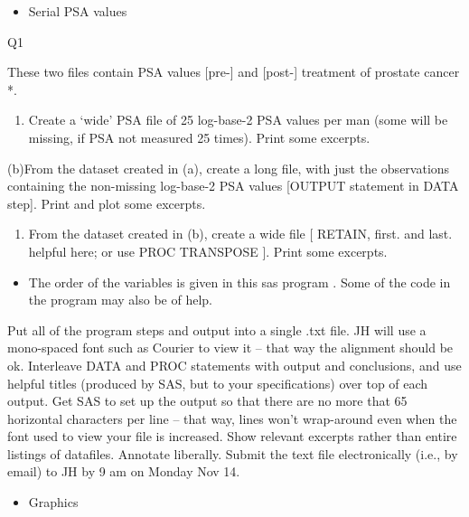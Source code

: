 \documentclass[]{book}
\providecommand{\tightlist}{%
  \setlength{\itemsep}{0pt}\setlength{\parskip}{0pt}}
\begin{document}
\begin{itemize}
\tightlist
\item
  Serial PSA values
\end{itemize}

Q1

These two files contain PSA values {[}pre-{]} and {[}post-{]} treatment of prostate cancer *.

\begin{enumerate}
\def\labelenumi{(\alph{enumi})}
\tightlist
\item
  Create a `wide' PSA file of 25 log-base-2 PSA values per man (some will be missing, if PSA not measured 25 times). Print some excerpts.
\end{enumerate}

(b)From the dataset created in (a), create a long file, with just the observations containing the non-missing log-base-2 PSA values {[}OUTPUT statement in DATA step{]}. Print and plot some excerpts.

\begin{enumerate}
\def\labelenumi{(\alph{enumi})}
\setcounter{enumi}{2}
\tightlist
\item
  From the dataset created in (b), create a wide file {[} RETAIN, first. and last. helpful here; or use PROC TRANSPOSE {]}. Print some excerpts.
\end{enumerate}

\begin{itemize}
\tightlist
\item
  The order of the variables is given in this sas program . Some of the code in the program may also be of help.
\end{itemize}

Put all of the program steps and output into a single .txt file. JH will use a mono-spaced font such as Courier to view it -- that way the alignment should be ok. Interleave DATA and PROC statements with output and conclusions, and use helpful titles (produced by SAS, but to your specifications) over top of each output. Get SAS to set up the output so that there are no more that 65 horizontal characters per line -- that way, lines won't wrap-around even when the font used to view your file is increased. Show relevant excerpts rather than entire listings of datafiles. Annotate liberally. Submit the text file electronically (i.e., by email) to JH by 9 am on Monday Nov 14.

\begin{itemize}
\tightlist
\item
  Graphics
\end{itemize}
\end{document}
